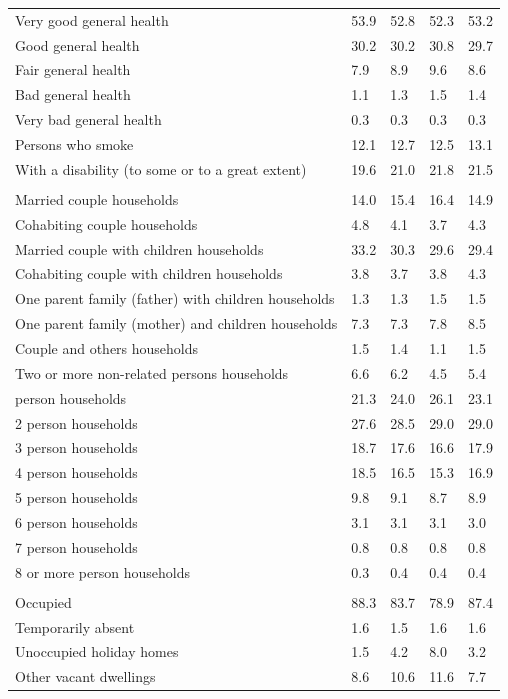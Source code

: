 \documentclass{article}
\begin{document}
\begin{table}[h]
\begin{tabular}{KTTTT}
    \hline
Very good general health & 53.9& 52.8&52.3& 53.2\\
Good general health & 30.2& 30.2& 30.8& 29.7\\
Fair general health & 7.9& 8.9&9.6& 8.6\\
Bad general health & 1.1& 1.3&1.5& 1.4\\
Very bad general health & 0.3& 0.3&0.3& 0.3\\
    \hline
Persons who smoke & 12.1& 12.7&12.5& 13.1\\
    \hline
With a disability (to some or to a great extent) & 19.6& 21.0&21.8& 21.5\\
\hline
    \\ 
    \hline
Married couple households & 14.0& 15.4& 16.4& 14.9\\
Cohabiting couple households & 4.8& 4.1& 3.7& 4.3\\
Married couple with children households & 33.2& 30.3& 29.6& 29.4\\
Cohabiting couple with children households & 3.8& 3.7& 3.8& 4.3\\
One parent family (father) with  children households & 1.3& 1.3& 1.5& 1.5\\
One parent family (mother) and children households & 7.3& 7.3& 7.8& 8.5\\
Couple and others households  & 1.5& 1.4& 1.1& 1.5\\
Two or more non-related persons households & 6.6& 6.2& 4.5& 5.4\\
     person households & 21.3& 24.0& 26.1& 23.1\\
2 person households & 27.6& 28.5& 29.0& 29.0\\
3 person households & 18.7& 17.6& 16.6& 17.9\\
4 person households & 18.5& 16.5& 15.3& 16.9\\
5 person households & 9.8& 9.1& 8.7& 8.9\\
6 person households & 3.1& 3.1& 3.1& 3.0\\
7 person households & 0.8& 0.8& 0.8& 0.8\\
8 or more person households & 0.3& 0.4& 0.4& 0.4\\
\hline
    \\ 
    \hline
Occupied & 88.3& 83.7& 78.9& 87.4\\
Temporarily absent & 1.6& 1.5& 1.6& 1.6\\
Unoccupied holiday homes & 1.5& 4.2& 8.0& 3.2\\
Other vacant dwellings &  8.6& 10.6& 11.6&  7.7\\
\hline
\end{tabular}
\end{table}
\end{document}
